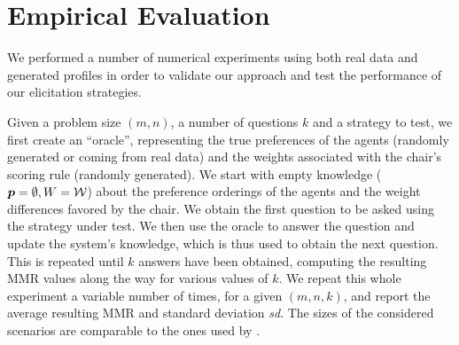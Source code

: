 \documentclass{article}
\begin{document}

\section{Empirical Evaluation} 
\label{sec:experiments}
We  performed a number of numerical experiments using both real data and generated profiles in order to validate our approach and test the performance of our elicitation strategies. %

Given a problem size $(m, n)$, a number of questions $k$ and a strategy to test, we first create an “oracle”, representing the true preferences of the agents (randomly generated or coming from real data) and the weights associated with the chair’s scoring rule (randomly generated).
We start with empty knowledge (${\bm{p}} = \emptyset, W = \mathcal{W}$) about the preference orderings of the agents and the weight differences favored by the chair. We obtain the first question to be asked using the strategy under test. We then use the oracle to answer the question and update the system's knowledge, which is thus used to obtain the next question. This is repeated until $k$ answers have been obtained, computing the resulting MMR values along the way for various values of $k$. We repeat this whole experiment a variable number of times, for a given $(m, n, k)$, and report the average resulting MMR and standard deviation \textit{sd}. The sizes of the considered scenarios are comparable to the ones used by \citet{Cailloux2014}. 
\end{document}
